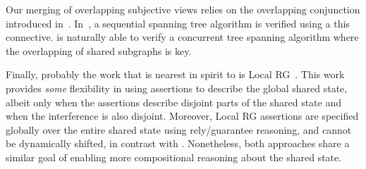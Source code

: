 Our merging of overlapping subjective views relies on the overlapping
conjunction introduced in~\cite{rey-slnotes,js-popl12,ramification}.
In~\cite{ramification}, a sequential spanning tree algorithm is
verified using a this connective. \colosl is naturally able to verify
a concurrent tree spanning algorithm where the overlapping of shared
subgraphs is key.



Finally, probably the work that is nearest in spirit to  \colosl is
Local RG~\cite{lrg}. This work provides {\em some}  flexibility in using
assertions to describe the global shared state,
 albeit only
when the assertions describe disjoint parts of the shared state  and when
the interference is  also disjoint. Moreover, Local
RG assertions are specified globally over the entire shared state
using rely/guarantee reasoning, and
cannot be dynamically shifted, in contrast with
\colosl. Nonetheless, both approaches share a similar goal of enabling
more compositional reasoning about the shared state.









